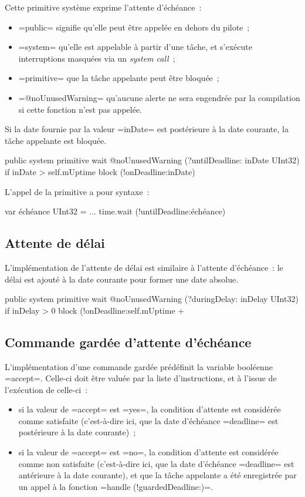 Cette primitive système exprime l'attente d'échéance~:
\begin{itemize}
  \item \plm=public= signifie qu'elle peut être appelée en dehors du pilote~;
  \item \plm=system= qu'elle est appelable à partir d'une tâche, et s'exécute interruptions masquées via un \emph{system call}~;
  \item \plm=primitive= que la tâche appelante peut être bloquée~;
  \item \plm=@noUnusedWarning= qu'aucune alerte ne sera engendrée par la compilation si cette fonction n'est pas appelée.
\end{itemize}

Si la date fournie par la valeur \plm=inDate= est postérieure à la date courante, la tâche appelante est bloquée.

\begin{PLM}
public system primitive
wait @noUnusedWarning (?untilDeadline: inDate UInt32) {
  if inDate > self.mUptime {
    block (!onDeadline:inDate)
  }
}
\end{PLM}

L'appel de la primitive a pour syntaxe~:
\begin{PLM}
var échéance UInt32 = ...
time.wait (!untilDeadline:échéance)
\end{PLM}




\subsection{Attente de délai}

L'implémentation de l'attente de délai est similaire à l'attente d'échéance~: le délai est ajouté à la date courante pour former une date absolue.

\begin{PLM}
public system primitive
wait @noUnusedWarning (?duringDelay: inDelay UInt32) {
  if inDelay > 0 {
    block (!onDeadline:self.mUptime +%
  }
}
\end{PLM}


\subsection{Commande gardée d'attente d'échéance}

L'implémentation d'une commande gardée prédéfinit la variable booléenne \plm=accept=. Celle-ci doit être valuée par la liste d'instructions, et à l'issue de l'exécution de celle-ci~:
\begin{itemize}
  \item si la valeur de \plm=accept= est \plm=yes=, la condition d'attente est considérée comme satisfaite (c'est-à-dire ici, que la date d'échéance \plm=deadline= est postérieure à la date courante)~;
  \item si la valeur de \plm=accept= est \plm=no=, la condition d'attente est considérée comme non satisfaite (c'est-à-dire ici, que la date d'échéance \plm=deadline= est antérieure à la date courante), et que la tâche appelante a été enregistrée par un appel à la fonction \plm=handle (!guardedDeadline:)=. 
\end{itemize}

